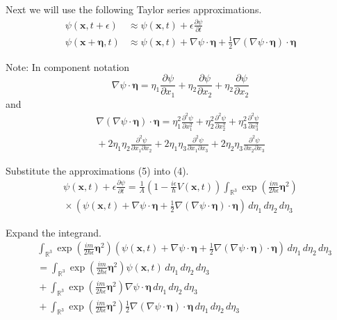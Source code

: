 Next we will use the following Taylor series approximations.
\begin{equation*}
\begin{aligned}
\psi(\mathbf x,t+\epsilon)&\approx\psi(\mathbf x,t)+\epsilon\frac{\partial\psi}{\partial t}
\\
\psi(\mathbf x+\boldsymbol\eta,t)&\approx\psi(\mathbf x,t)+\nabla\psi\cdot\boldsymbol\eta
+\tfrac{1}{2}\nabla(\nabla\psi\cdot\boldsymbol\eta)\cdot\boldsymbol\eta
\end{aligned}
\tag{5}
\end{equation*}

Note: In component notation
\begin{equation*}
\nabla\psi\cdot\boldsymbol\eta=
\eta_1\frac{\partial\psi}{\partial x_1}+
\eta_2\frac{\partial\psi}{\partial x_2}+
\eta_2\frac{\partial\psi}{\partial x_2}
\end{equation*}
and
\begin{multline*}
\nabla(\nabla\psi\cdot\boldsymbol\eta)\cdot\boldsymbol\eta=
\eta_1^2\frac{\partial^2\psi}{\partial x_1^2}
+\eta_2^2\frac{\partial^2\psi}{\partial x_2^2}
+\eta_3^2\frac{\partial^2\psi}{\partial x_3^2}
\\
{}+2\eta_1\eta_2\frac{\partial^2\psi}{\partial x_1\partial x_2}
+2\eta_1\eta_3\frac{\partial^2\psi}{\partial x_1\partial x_3}
+2\eta_2\eta_3\frac{\partial^2\psi}{\partial x_2\partial x_3}
\end{multline*}

Substitute the approximations (5) into (4).
\begin{multline*}
\psi(\mathbf{x},t)+\epsilon\frac{\partial\psi}{\partial t}=
\frac{1}{A}
\left(1-\frac{i\epsilon}{\hbar}V\left(\mathbf x,t\right)\right)
\int_{\mathbb R^3}
\exp\left(\frac{im}{2\hbar\epsilon}\boldsymbol\eta^2\right)
\\
{}\times\left(
\psi(\mathbf x,t)
+\nabla\psi\cdot\boldsymbol\eta
+\tfrac{1}{2}\nabla(\nabla\psi\cdot\boldsymbol\eta)\cdot\boldsymbol\eta
\right)\,d\eta_1\,d\eta_2\,d\eta_3
\tag{6}
\end{multline*}

Expand the integrand.
\begin{align*}
&\int_{\mathbb R^3}
\exp\left(\frac{im}{2\hbar\epsilon}\boldsymbol\eta^2\right)
\left(
\psi(\mathbf x,t)
+\nabla\psi\cdot\boldsymbol\eta
+\tfrac{1}{2}\nabla(\nabla\psi\cdot\boldsymbol\eta)\cdot\boldsymbol\eta
\right)\,d\eta_1\,d\eta_2\,d\eta_3
\\
&{}=\int_{\mathbb R^3}
\exp\left(\frac{im}{2\hbar\epsilon}\boldsymbol\eta^2\right)
\psi(\mathbf x,t)
\,d\eta_1\,d\eta_2\,d\eta_3
\tag{7}
\\
&{}+\int_{\mathbb R^3}
\exp\left(\frac{im}{2\hbar\epsilon}\boldsymbol\eta^2\right)
\nabla\psi\cdot\boldsymbol\eta
\,d\eta_1\,d\eta_2\,d\eta_3
\tag{8}
\\
&{}+\int_{\mathbb R^3}
\exp\left(\frac{im}{2\hbar\epsilon}\boldsymbol\eta^2\right)
\tfrac{1}{2}
\nabla(\nabla\psi\cdot\boldsymbol\eta)\cdot\boldsymbol\eta
\,d\eta_1\,d\eta_2\,d\eta_3
\tag{9}
\end{align*}

